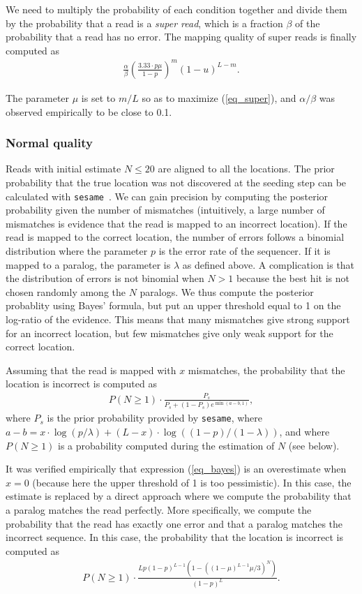 \documentclass[english]{article}
\begin{document}
We need to multiply the probability of each condition together and divide
them by the probability that a read is a \emph{super read}, which is a
fraction $\beta$ of the probability that a read has no error. The mapping
quality of super reads is finally computed as
\begin{align}
\label{eq_super}
\frac{\alpha}{\beta} \left( \frac{3.33 \cdot p\mu}{1-p}
\right)^m (1-u)^{L-m}.
\end{align}

The parameter $\mu$ is set to $m/L$ so as to maximize (\ref{eq_super}),
and $\alpha/\beta$ was observed empirically to be close to 0.1.


\subsubsection{Normal quality} Reads with initial estimate $N \leq 20$ are
aligned to all the locations. The prior probability that the true location
was not discovered at the seeding step can be calculated with
\texttt{sesame}~\cite{Filion619155}. We can gain precision by computing
the posterior probability given the number of mismatches (intuitively, a
large number of mismatches is evidence that the read is mapped to an
incorrect location). If the read is mapped to the correct location, the
number of errors follows a binomial distribution where the parameter $p$
is the error rate of the sequencer. If it is mapped to a paralog, the
parameter is $\lambda$ as defined above. A complication is that the
distribution of errors is not binomial when $N > 1$ because the best hit
is not chosen randomly among the $N$ paralogs. We thus compute the
posterior probablity using Bayes' formula, but put an upper threshold equal
to 1 on the log-ratio of the evidence. This means that many mismatches
give strong support for an incorrect location, but few mismatches give
only weak support for the correct location.

Assuming that the read is mapped with $x$ mismatches, the probability that
the location is incorrect is computed as
\begin{align}
\label{eq_bayes}
P(N \geq 1) \cdot \frac{P_s}{P_s + (1-P_s)e^{\min(a-b,1)}},
\end{align}
where $P_s$ is the prior probability provided by \texttt{sesame}, where
$a-b=x \cdot \log(p/\lambda)+(L-x) \cdot \log((1-p)/(1-\lambda))$, and
where $P(N \geq 1)$ is a probability computed during the estimation of $N$
(see below).

It was verified empirically that expression (\ref{eq_bayes}) is an
overestimate when $x = 0$ (because here the upper threshold of 1 is too
pessimistic). In this case, the estimate is replaced by a direct approach
where we compute the probability that a paralog matches the read
perfectly. More specifically, we compute the probability that the read has
exactly one error and that a paralog matches the incorrect sequence. In
this case, the probability that the location is incorrect is computed as
\begin{align}
\label{eq_x0}
P(N \geq 1) \cdot \frac{Lp(1-p)^{L-1}
\left(1-\left((1-\mu)^{L-1}\mu/3\right)^N\right)}{(1-p)^L}.
\end{align}
\end{document}
